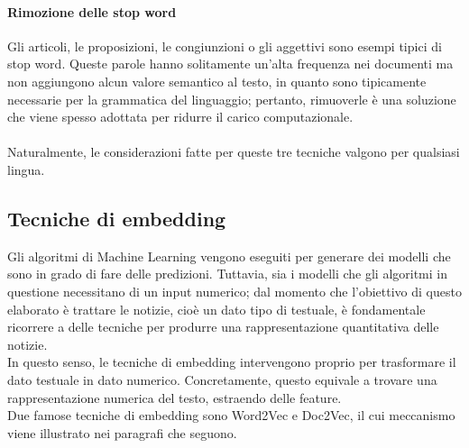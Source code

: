 \documentclass[12pt]{report}
\theoremstyle{definition}
\begin{document}
\paragraph{Rimozione delle stop word}
Gli articoli, le proposizioni, le congiunzioni o gli aggettivi sono esempi tipici di stop word. Queste parole hanno solitamente un'alta frequenza nei documenti ma non aggiungono alcun valore semantico al testo, in quanto sono tipicamente necessarie per la grammatica del linguaggio; pertanto, rimuoverle è una soluzione che viene spesso adottata per ridurre il carico computazionale.
\\
\\
Naturalmente, le considerazioni fatte per queste tre tecniche valgono per qualsiasi lingua.

\subsection{Tecniche di embedding} \label{embedding}
Gli algoritmi di Machine Learning vengono eseguiti per generare dei modelli che sono in grado di fare delle predizioni. Tuttavia, sia i modelli che gli algoritmi in questione necessitano di un input numerico; dal momento che l'obiettivo di questo elaborato è trattare le notizie, cioè un dato tipo di testuale, è fondamentale ricorrere a delle tecniche per produrre una rappresentazione quantitativa delle notizie.
\\
In questo senso, le tecniche di embedding intervengono proprio per trasformare il dato testuale in dato numerico.
Concretamente, questo equivale a trovare una rappresentazione numerica del testo, estraendo delle feature.
\\
Due famose tecniche di embedding sono Word2Vec e Doc2Vec, il cui meccanismo viene illustrato nei paragrafi che seguono.
\end{document}
